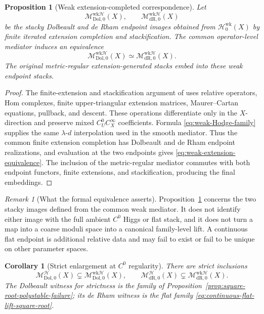 \documentclass[11pt,reqno]{amsart}
\newtheorem{proposition}[theorem]{Proposition}
\newtheorem{corollary}[theorem]{Corollary}
\theoremstyle{definition}
\theoremstyle{remark}
\newtheorem{remark}[theorem]{Remark}
\newcommand{\cH}{\mathcal H}
\newcommand{\Dol}{\mathrm{Dol}}
\newcommand{\dR}{\mathrm{dR}}
\begin{document}
\begin{proposition}[Weak extension-completed correspondence]\label{prop:weak-extension-correspondence}
Let
\[
  \mathscr M_{\Dol,0}^{\mathrm{wk}\cH}(X),
  \qquad
  \mathscr M_{\dR,0}^{\mathrm{wk}\cH}(X)
\]
be the stacky Dolbeault and de Rham endpoint images obtained from $\mathscr H^{\mathrm{wk}}_0(X)$ by finite iterated extension completion and stackification.  The common operator-level mediator induces an equivalence
\begin{equation}\label{eq:weak-extension-equivalence}
  \mathscr M_{\Dol,0}^{\mathrm{wk}\cH}(X)
  \simeq
  \mathscr M_{\dR,0}^{\mathrm{wk}\cH}(X).
\end{equation}
The original metric-regular extension-generated stacks embed into these weak endpoint stacks.
\end{proposition}

\begin{proof}
The finite-extension and stackification argument of \cite{AzamRayan2026} uses relative operators, Hom complexes, finite upper-triangular extension matrices, Maurer--Cartan equations, pullback, and descent.  These operations differentiate only in the $X$-direction and preserve mixed $C^0_UC^\infty_X$ coefficients.  Formula \eqref{eq:weak-Hodge-family} supplies the same $\lambda$-$d$ interpolation used in the smooth mediator.  Thus the common finite extension completion has Dolbeault and de Rham endpoint realizations, and evaluation at the two endpoints gives \eqref{eq:weak-extension-equivalence}.  The inclusion of the metric-regular mediator commutes with both endpoint functors, finite extensions, and stackification, producing the final embeddings.
\end{proof}

\begin{remark}[What the formal equivalence asserts]\label{rem:weak-correspondence-scope}
Proposition~\ref{prop:weak-extension-correspondence} concerns the two stacky images defined from the common weak mediator.  It does not identify either image with the full ambient $C^0$ Higgs or flat stack, and it does not turn a map into a coarse moduli space into a canonical family-level lift.  A continuous flat endpoint is additional relative data and may fail to exist or fail to be unique on other parameter spaces.
\end{remark}

\begin{corollary}[Strict enlargement at $C^0$ regularity]\label{cor:strict-weak-enlargement}
There are strict inclusions
\[
  \mathscr M_{\Dol,0}^{\cH}(X)
  \subsetneq
  \mathscr M_{\Dol,0}^{\mathrm{wk}\cH}(X),
  \qquad
  \mathscr M_{\dR,0}^{\cH}(X)
  \subsetneq
  \mathscr M_{\dR,0}^{\mathrm{wk}\cH}(X).
\]
The Dolbeault witness for strictness is the family of Proposition~\ref{prop:square-root-polystable-failure}; its de Rham witness is the flat family \eqref{eq:continuous-flat-lift-square-root}.
\end{corollary}
\end{document}
